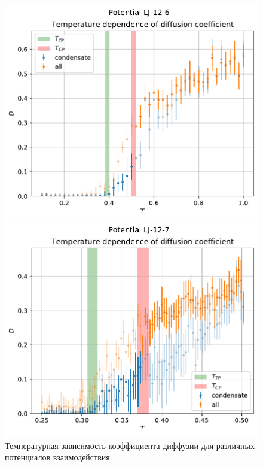 \documentclass[pdf,hyperref={unicode}]{beamer}
\begin{document}
\begin{frame}
\begin{figure}[h]
\begin{center}
\begin{minipage}[h]{0.35\linewidth}
\end{minipage}
\begin{minipage}[h]{0.35\linewidth}
\includegraphics[width=\textwidth, keepaspectratio]{plot_diffusion_Potential LJ-12-6_1}
\end{minipage}
\begin{minipage}[h]{0.35\linewidth}
\includegraphics[width=\textwidth, keepaspectratio]{plot_diffusion_Potential LJ-12-7_1}
\end{minipage}
\caption{\tiny Температурная зависимость коэффициента диффузии для различных потенциалов взаимодействия.}
\label{risD}
\end{center}
\end{figure}

\end{frame}
\end{document}
